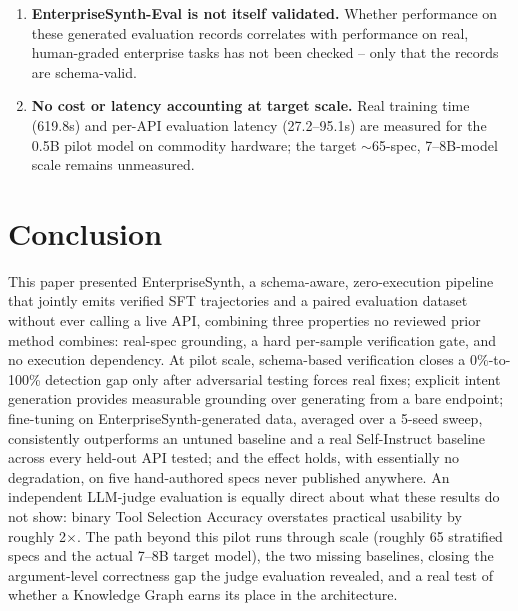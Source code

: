 \documentclass[letterpaper]{article} %
\begin{document}
\begin{enumerate}
    sample, and not yet given the same multi-seed treatment as the public comparison.
    \item \textbf{EnterpriseSynth-Eval is not itself validated.} Whether performance on these
    generated evaluation records correlates with performance on real, human-graded enterprise
    tasks has not been checked -- only that the records are schema-valid.
    \item \textbf{No cost or latency accounting at target scale.} Real training time (619.8s) and
    per-API evaluation latency (27.2--95.1s) are measured for the 0.5B pilot model on commodity
    hardware; the target $\sim$65-spec, 7--8B-model scale remains unmeasured.
\end{enumerate}

\section{Conclusion}
This paper presented EnterpriseSynth, a schema-aware, zero-execution pipeline that jointly emits
verified SFT trajectories and a paired evaluation dataset without ever calling a live API, combining
three properties no reviewed prior method combines: real-spec grounding, a hard per-sample
verification gate, and no execution dependency. At pilot scale, schema-based verification closes a
0\%-to-100\% detection gap only after adversarial testing forces real fixes; explicit intent
generation provides measurable grounding over generating from a bare endpoint; fine-tuning on
EnterpriseSynth-generated data, averaged over a 5-seed sweep, consistently outperforms an untuned
baseline and a real Self-Instruct baseline across every held-out API tested; and the effect holds,
with essentially no degradation, on five hand-authored specs never published anywhere. An
independent LLM-judge evaluation is equally direct about what these results do not show: binary
Tool Selection Accuracy overstates practical usability by roughly 2$\times$. The path beyond this
pilot runs through scale (roughly 65 stratified specs and the actual 7--8B target model), the two
missing baselines, closing the argument-level correctness gap the judge evaluation revealed, and a
real test of whether a Knowledge Graph earns its place in the architecture.


\end{document}
